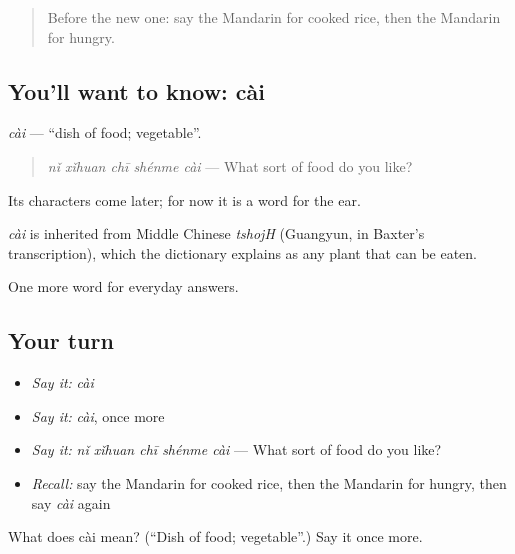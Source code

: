\label{lesson:ZH-C38-cai}



\begin{quote}
Before the new one: say the Mandarin for cooked rice, then the Mandarin for hungry.
\end{quote}

\subsection*{You'll want to know: cài}
\emph{cài} — \textquotedblleft{}dish of food; vegetable\textquotedblright{}.

\begin{quote}
\emph{nǐ xǐhuan chī shénme cài} — What sort of food do you like?
\end{quote}

Its characters come later; for now it is a word for the ear.

\begin{cousinweb}
\emph{cài} is inherited from Middle Chinese \emph{tshojH} (Guangyun, in Baxter's transcription), which the dictionary explains as any plant that can be eaten.
\end{cousinweb}

\begin{grammarlens}[title={What you've built}]
One more word for everyday answers.
\end{grammarlens}

\subsection*{Your turn}
\begin{itemize}
\raggedright
  \item \emph{Say it:} \emph{cài}
  \item \emph{Say it:} \emph{cài}, once more
  \item \emph{Say it:} \emph{nǐ xǐhuan chī shénme cài} — What sort of food do you like?
  \item \emph{Recall:} say the Mandarin for cooked rice, then the Mandarin for hungry, then say \emph{cài} again
\end{itemize}

\begin{tcolorbox}[breakable,colback=teal!4,colframe=teal!35!black,title={Before you move on}]
What does cài mean? (\textquotedblleft{}Dish of food; vegetable\textquotedblright{}.) Say it once more.
\end{tcolorbox}
